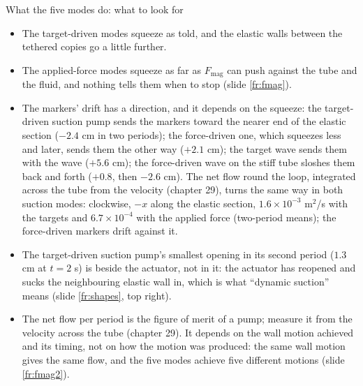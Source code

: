 \documentclass[aspectratio=169,11pt]{beamer}
\begin{document}
\begin{frame}{What the five modes do: what to look for}
\label{fr:lookfor}
\footnotesize
\begin{itemize}
  \item The target-driven modes squeeze as told, and the elastic walls between the tethered copies go a little further.
  \item The applied-force modes squeeze as far as $F_{\mathrm{mag}}$ can push against the tube and the fluid, and nothing tells them when to stop (slide \ref{fr:fmag}).
  \item The markers' drift has a direction, and it depends on the squeeze: the target-driven suction pump sends the markers toward the nearer end of the elastic section ($-2.4$ cm in two periods); the force-driven one, which squeezes less and later, sends them the other way ($+2.1$ cm); the target wave sends them with the wave ($+5.6$ cm); the force-driven wave on the stiff tube sloshes them back and forth ($+0.8$, then $-2.6$ cm). The net flow round the loop, integrated across the tube from the velocity (chapter 29), turns the same way in both suction modes: clockwise, $-x$ along the elastic section, $1.6 \times 10^{-3}$ m$^2$/s with the targets and $6.7 \times 10^{-4}$ with the applied force (two-period means); the force-driven markers drift against it.
  \item The target-driven suction pump's smallest opening in its second period ($1.3$ cm at $t = 2$ s) is beside the actuator, not in it: the actuator has reopened and sucks the neighbouring elastic wall in, which is what ``dynamic suction'' means (slide \ref{fr:shapes}, top right).
  \item The net flow per period is the figure of merit of a pump; measure it from the velocity across the tube (chapter 29). It depends on the wall motion achieved and its timing, not on how the motion was produced: the same wall motion gives the same flow, and the five modes achieve five different motions (slide \ref{fr:fmag2}).
\end{itemize}
\end{frame}
\end{document}
